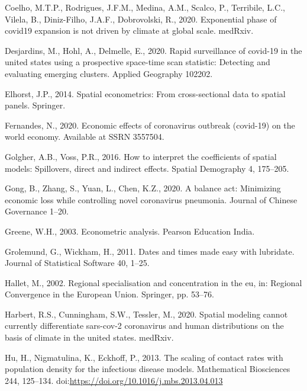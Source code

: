 \documentclass[]{elsarticle} %
\begin{document}
\leavevmode\hypertarget{ref-Coelho2020exponential}{}%
Coelho, M.T.P., Rodrigues, J.F.M., Medina, A.M., Scalco, P., Terribile,
L.C., Vilela, B., Diniz-Filho, J.A.F., Dobrovolski, R., 2020.
Exponential phase of covid19 expansion is not driven by climate at
global scale. medRxiv.

\leavevmode\hypertarget{ref-Desjardins2020rapid}{}%
Desjardins, M., Hohl, A., Delmelle, E., 2020. Rapid surveillance of
covid-19 in the united states using a prospective space-time scan
statistic: Detecting and evaluating emerging clusters. Applied Geography
102202.

\leavevmode\hypertarget{ref-Elhorst2014spatial}{}%
Elhorst, J.P., 2014. Spatial econometrics: From cross-sectional data to
spatial panels. Springer.

\leavevmode\hypertarget{ref-Fernandes2020economic}{}%
Fernandes, N., 2020. Economic effects of coronavirus outbreak (covid-19)
on the world economy. Available at SSRN 3557504.

\leavevmode\hypertarget{ref-Golgher2016interpret}{}%
Golgher, A.B., Voss, P.R., 2016. How to interpret the coefficients of
spatial models: Spillovers, direct and indirect effects. Spatial
Demography 4, 175--205.

\leavevmode\hypertarget{ref-Gong2020balance}{}%
Gong, B., Zhang, S., Yuan, L., Chen, K.Z., 2020. A balance act:
Minimizing economic loss while controlling novel coronavirus pneumonia.
Journal of Chinese Governance 1--20.

\leavevmode\hypertarget{ref-Greene2003econometric}{}%
Greene, W.H., 2003. Econometric analysis. Pearson Education India.

\leavevmode\hypertarget{ref-Grolemund2011dates}{}%
Grolemund, G., Wickham, H., 2011. Dates and times made easy with
lubridate. Journal of Statistical Software 40, 1--25.

\leavevmode\hypertarget{ref-Hallet2002regional}{}%
Hallet, M., 2002. Regional specialisation and concentration in the eu,
in: Regional Convergence in the European Union. Springer, pp. 53--76.

\leavevmode\hypertarget{ref-Harbert2020spatial}{}%
Harbert, R.S., Cunningham, S.W., Tessler, M., 2020. Spatial modeling
cannot currently differentiate sars-cov-2 coronavirus and human
distributions on the basis of climate in the united states. medRxiv.

\leavevmode\hypertarget{ref-Hu2013scaling}{}%
Hu, H., Nigmatulina, K., Eckhoff, P., 2013. The scaling of contact rates
with population density for the infectious disease models. Mathematical
Biosciences 244, 125--134.
doi:\href{https://doi.org/https://doi.org/10.1016/j.mbs.2013.04.013}{https://doi.org/10.1016/j.mbs.2013.04.013}
\end{document}

